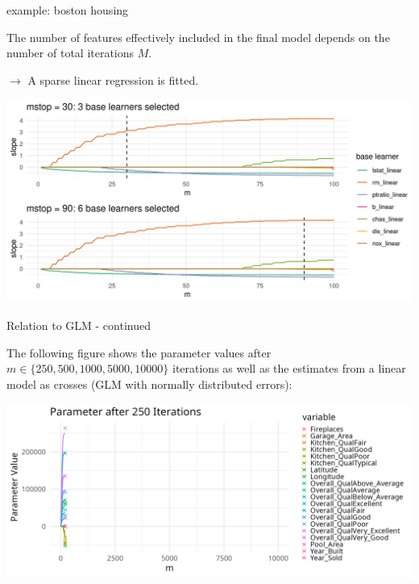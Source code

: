 \begin{vbframe}{example: boston housing}
\framebreak


The number of features effectively included in the final model depends on the
number of total iterations $M$.

\vfill

$\rightarrow$ A sparse linear regression is fitted.

\vfill

\includegraphics[width = \textwidth]{figure/compboost-illustration-2.png}

\end{vbframe}



\begin{vbframe}{Relation to GLM - continued}

The following figure shows the parameter values after $m \in \{250, 500, 1000, 5000, 10000\}$ iterations as well as the estimates from a linear model as crosses (GLM with normally distributed errors):

\begin{center}
\includegraphics[width=\textwidth]{figure/compboost-to-glm-iter250.png}
\end{center}

\end{vbframe}

